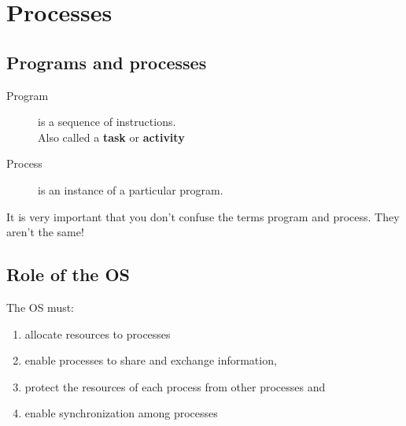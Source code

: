 \chapter{Processes}
\label{ch:processes}



\section{Programs and processes}

\begin{description}
\item[Program] is a sequence of instructions.\\
  Also called a \textbf{task} or \textbf{activity}
\item[Process] is an instance of a particular program.
\end{description}

It is very important that you don't confuse the terms program and process.
They aren't the same!

\section{Role of the OS}

The OS must:
\begin{enumerate}
\item allocate resources to processes
\item enable processes to share and exchange information,
\item protect the resources of each process from other processes and
\item enable synchronization among processes
\end{enumerate}


